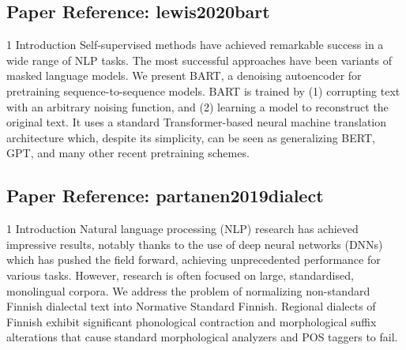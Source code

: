 \documentclass[11pt,a4paper]{article}
\begin{document}
\vspace{18pt}


\subsection*{Paper Reference: lewis2020bart}

1 Introduction Self-supervised methods have achieved remarkable success in a wide range of NLP tasks. The most successful approaches have been variants of masked language models. We present BART, a denoising autoencoder for pretraining sequence-to-sequence models. BART is trained by (1) corrupting text with an arbitrary noising function, and (2) learning a model to reconstruct the original text. It uses a standard Transformer-based neural machine translation architecture which, despite its simplicity, can be seen as generalizing BERT, GPT, and many other recent pretraining schemes.

\vspace{18pt}


\subsection*{Paper Reference: partanen2019dialect}

1 Introduction Natural language processing (NLP) research has achieved impressive results, notably thanks to the use of deep neural networks (DNNs) which has pushed the field forward, achieving unprecedented performance for various tasks. However, research is often focused on large, standardised, monolingual corpora. We address the problem of normalizing non-standard Finnish dialectal text into Normative Standard Finnish. Regional dialects of Finnish exhibit significant phonological contraction and morphological suffix alterations that cause standard morphological analyzers and POS taggers to fail.

\vspace{18pt}

\end{document}
